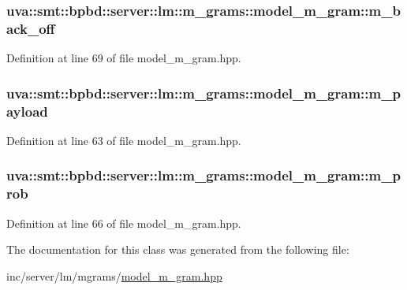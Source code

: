 \subsubsection[{m\+\_\+back\+\_\+off}]{ uva\+::smt\+::bpbd\+::server\+::lm\+::m\+\_\+grams\+::model\+\_\+m\+\_\+gram\+::m\+\_\+back\+\_\+off}\label{classuva_1_1smt_1_1bpbd_1_1server_1_1lm_1_1m__grams_1_1model__m__gram_a83e71902acec0a069af7622360788790}


Definition at line 69 of file model\+\_\+m\+\_\+gram.\+hpp.

\hypertarget{classuva_1_1smt_1_1bpbd_1_1server_1_1lm_1_1m__grams_1_1model__m__gram_acc7ca63db888d6daa71662c412398ebd}{}
\subsubsection[{m\+\_\+payload}]{ uva\+::smt\+::bpbd\+::server\+::lm\+::m\+\_\+grams\+::model\+\_\+m\+\_\+gram\+::m\+\_\+payload}\label{classuva_1_1smt_1_1bpbd_1_1server_1_1lm_1_1m__grams_1_1model__m__gram_acc7ca63db888d6daa71662c412398ebd}


Definition at line 63 of file model\+\_\+m\+\_\+gram.\+hpp.

\hypertarget{classuva_1_1smt_1_1bpbd_1_1server_1_1lm_1_1m__grams_1_1model__m__gram_a498a480327f996df10727f2986347d5e}{}
\subsubsection[{m\+\_\+prob}]{ uva\+::smt\+::bpbd\+::server\+::lm\+::m\+\_\+grams\+::model\+\_\+m\+\_\+gram\+::m\+\_\+prob}\label{classuva_1_1smt_1_1bpbd_1_1server_1_1lm_1_1m__grams_1_1model__m__gram_a498a480327f996df10727f2986347d5e}


Definition at line 66 of file model\+\_\+m\+\_\+gram.\+hpp.



The documentation for this class was generated from the following file\+:\begin{DoxyCompactItemize}
\item 
inc/server/lm/mgrams/\hyperlink{model__m__gram_8hpp}{model\+\_\+m\+\_\+gram.\+hpp}\end{DoxyCompactItemize}
